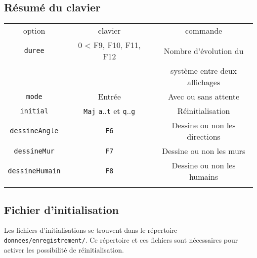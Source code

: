\subsection{Résumé du clavier}
\begin{center}
\begin{tabular}{ccccc}
option & & clavier &  & commande \\
\texttt{duree} &  & 0 < {\sf F9}, {\sf F10}, {\sf F11}, {\sf F12} &  & Nombre d'évolution du \\
 &  &  &  & système entre deux affichages \\
\texttt{mode} &  & {\sf Entrée} &  & Avec ou sans attente \\
%
\texttt{initial} &  & \texttt{Maj} \texttt{a}..\texttt{t} et \texttt{q}..\texttt{g} &  & Réinitialisation \\
\texttt{dessineAngle} &  & \texttt{F6} &  & Dessine ou non les directions \\
\texttt{dessineMur} &  & \texttt{F7} &  & Dessine ou non les murs \\
\texttt{dessineHumain} &  & \texttt{F8} &  & Dessine ou non les humains \\

\\
\end{tabular}
\end{center}
%
\subsection{Fichier d'initialisation}
%
Les fichiers d'initialisations se trouvent dans le répertoire \texttt{donnees/enregistrement/}. Ce répertoire et ces fichiers sont nécessaires pour activer les possibilité de réinitialisation.
%
